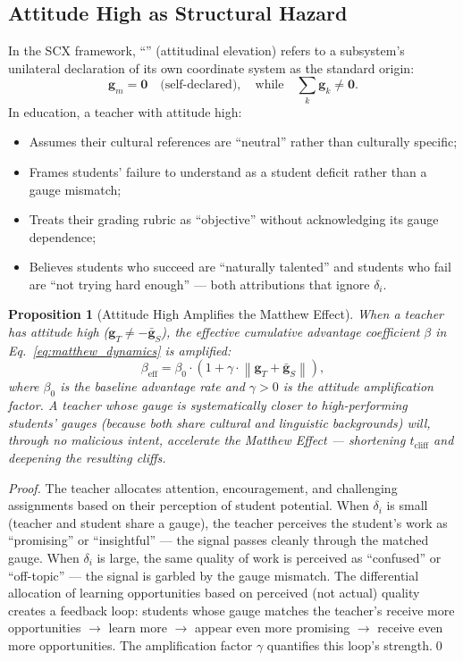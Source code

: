 \documentclass[11pt,a4paper]{article}
\newtheorem{proposition}[theorem]{Proposition}
\newcommand{\norm}[1]{\left\lVert#1\right\rVert}
\begin{document}
\subsection{Attitude High as Structural Hazard}
In the SCX framework, ``'' (attitudinal elevation) refers to a subsystem's unilateral declaration of its own coordinate system as the standard origin:
\begin{equation}
    \mathbf{g}_m = \mathbf{0} \quad \text{(self-declared)}, \quad \text{while} \quad \sum_{k} \mathbf{g}_k \neq \mathbf{0}.
\end{equation}
In education, a teacher with attitude high:
\begin{itemize}
    \item Assumes their cultural references are ``neutral'' rather than culturally specific;
    \item Frames students' failure to understand as a student deficit rather than a gauge mismatch;
    \item Treats their grading rubric as ``objective'' without acknowledging its gauge dependence;
    \item Believes students who succeed are ``naturally talented'' and students who fail are ``not trying hard enough'' — both attributions that ignore $\delta_i$.
\end{itemize}
\begin{proposition}[Attitude High Amplifies the Matthew Effect]
\label{prop:attitude_matthew}
When a teacher has attitude high ($\mathbf{g}_T \neq -\bar{\mathbf{g}}_S$), the effective cumulative advantage coefficient $\beta$ in Eq.~\eqref{eq:matthew_dynamics} is amplified:
\begin{equation}
    \beta_{\text{eff}} = \beta_0 \cdot (1 + \gamma \cdot \norm{\mathbf{g}_T + \bar{\mathbf{g}}_S}),
\end{equation}
where $\beta_0$ is the baseline advantage rate and $\gamma > 0$ is the attitude amplification factor. A teacher whose gauge is systematically closer to high-performing students' gauges (because both share cultural and linguistic backgrounds) will, through no malicious intent, accelerate the Matthew Effect — shortening $t_{\text{cliff}}$ and deepening the resulting cliffs.
\end{proposition}
\begin{proof}
The teacher allocates attention, encouragement, and challenging assignments based on their perception of student potential. When $\delta_i$ is small (teacher and student share a gauge), the teacher perceives the student's work as ``promising'' or ``insightful'' — the signal passes cleanly through the matched gauge. When $\delta_i$ is large, the same quality of work is perceived as ``confused'' or ``off-topic'' — the signal is garbled by the gauge mismatch. The differential allocation of learning opportunities based on perceived (not actual) quality creates a feedback loop: students whose gauge matches the teacher's receive more opportunities $\to$ learn more $\to$ appear even more promising $\to$ receive even more opportunities. The amplification factor $\gamma$ quantifies this loop's strength.\qed
\end{proof}
\end{document}
